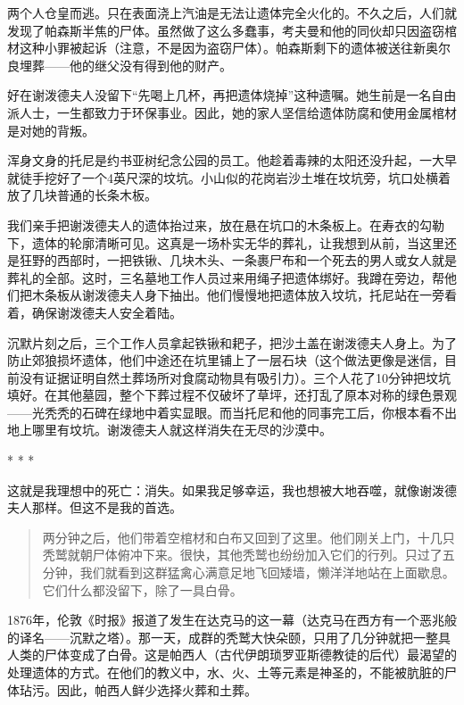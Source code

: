\documentclass[12pt,oneside]{book}
\begin{document}
\begin{bookref}[frametitle={\cite{好好告别：世界葬礼观察手记}}]
两个人仓皇而逃。只在表面浇上汽油是无法让遗体完全火化的。不久之后，人们就发现了帕森斯半焦的尸体。虽然做了这么多蠢事，考夫曼和他的同伙却只因盗窃棺材这种小罪被起诉（注意，不是因为盗窃尸体）。帕森斯剩下的遗体被送往新奥尔良埋葬——他的继父没有得到他的财产。

好在谢泼德夫人没留下“先喝上几杯，再把遗体烧掉”这种遗嘱。她生前是一名自由派人士，一生都致力于环保事业。因此，她的家人坚信给遗体防腐和使用金属棺材是对她的背叛。

浑身文身的托尼是约书亚树纪念公园的员工。他趁着毒辣的太阳还没升起，一大早就徒手挖好了一个4英尺深的坟坑。小山似的花岗岩沙土堆在坟坑旁，坑口处横着放了几块普通的长条木板。

我们亲手把谢泼德夫人的遗体抬过来，放在悬在坑口的木条板上。在寿衣的勾勒下，遗体的轮廓清晰可见。这真是一场朴实无华的葬礼，让我想到从前，当这里还是狂野的西部时，一把铁锹、几块木头、一条裹尸布和一个死去的男人或女人就是葬礼的全部。这时，三名墓地工作人员过来用绳子把遗体绑好。我蹲在旁边，帮他们把木条板从谢泼德夫人身下抽出。他们慢慢地把遗体放入坟坑，托尼站在一旁看着，确保谢泼德夫人安全着陆。

沉默片刻之后，三个工作人员拿起铁锹和耙子，把沙土盖在谢泼德夫人身上。为了防止郊狼损坏遗体，他们中途还在坑里铺上了一层石块（这个做法更像是迷信，目前没有证据证明自然土葬场所对食腐动物具有吸引力）。三个人花了10分钟把坟坑填好。在其他墓园，整个下葬过程不仅破坏了草坪，还打乱了原本对称的绿色景观——光秃秃的石碑在绿地中着实显眼。而当托尼和他的同事完工后，你根本看不出地上哪里有坟坑。谢泼德夫人就这样消失在无尽的沙漠中。

\begin{center}
* * *
\end{center}

这就是我理想中的死亡：消失。如果我足够幸运，我也想被大地吞噬，就像谢泼德夫人那样。但这不是我的首选。

\begin{quotation}
两分钟之后，他们带着空棺材和白布又回到了这里。他们刚关上门，十几只秃鹫就朝尸体俯冲下来。很快，其他秃鹫也纷纷加入它们的行列。只过了五分钟，我们就看到这群猛禽心满意足地飞回矮墙，懒洋洋地站在上面歇息。它们什么都没留下，除了一具白骨。
\end{quotation}

1876年，伦敦《时报》报道了发生在达克马的这一幕（达克马在西方有一个恶兆般的译名——沉默之塔）。那一天，成群的秃鹫大快朵颐，只用了几分钟就把一整具人类的尸体变成了白骨。这是帕西人（古代伊朗琐罗亚斯德教徒的后代）最渴望的处理遗体的方式。在他们的教义中，水、火、土等元素是神圣的，不能被肮脏的尸体玷污。因此，帕西人鲜少选择火葬和土葬。


\end{bookref}
\end{document}
